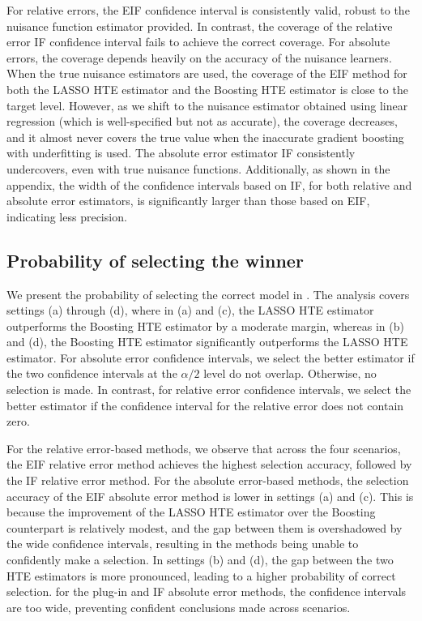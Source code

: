 \documentclass[twoside]{article}
\newcommand{\1}{{\mathbbm{1}}}
\begin{document}
For relative errors, the EIF confidence interval is consistently valid, robust to the nuisance function estimator provided.
In contrast, the coverage of the relative error IF confidence interval fails to achieve the correct coverage.
For absolute errors, the coverage depends heavily on the accuracy of the nuisance learners. 
When the true nuisance estimators are used, the coverage of the EIF method for both the LASSO HTE estimator and the Boosting HTE estimator is close to the target level. However, as we shift to the nuisance estimator obtained using linear regression (which is well-specified but not as accurate), the coverage decreases, and it almost never covers the true value when the inaccurate gradient boosting with underfitting is used. 
The absolute error estimator IF consistently undercovers, even with true nuisance functions.
Additionally, as shown in the appendix, 
the width of the confidence intervals based on IF, for both relative and absolute error estimators, is significantly larger than those based on EIF, indicating less precision.


\subsection{Probability of selecting the winner}\label{sec:selection.accuracy}

We present the probability of selecting the correct model in . The analysis covers settings (a) through (d), where in (a) and (c), the LASSO HTE estimator outperforms the Boosting HTE estimator by a moderate margin, whereas in (b) and (d), the Boosting HTE estimator significantly outperforms the LASSO HTE estimator.
For absolute error confidence intervals, we select the better estimator if the two confidence intervals at the $\alpha/2$ level do not overlap. Otherwise, no selection is made. 
In contrast, for relative error confidence intervals, we select the better estimator if the confidence interval for the relative error does not contain zero.


For the relative error-based methods, we observe that across the four scenarios, the EIF relative error method achieves the highest selection accuracy, followed by the IF relative error method. 
For the absolute error-based methods, the selection accuracy of the EIF absolute error method is lower in settings (a) and (c). This is because the improvement of the LASSO HTE estimator over the Boosting counterpart is relatively modest, and the gap between them is overshadowed by the wide confidence intervals, resulting in the methods being unable to confidently make a selection. 
In settings (b) and (d), the gap between the two HTE estimators is more pronounced, leading to a higher probability of correct selection. 
for the plug-in and IF absolute error methods, the confidence intervals are too wide, preventing confident conclusions made across scenarios.
\end{document}
